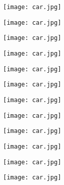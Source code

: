\begin{figure}[h!]
	\centering
	\begin{subfigure}[b]{0.225\linewidth}
		\texttt{[image: car.jpg]} %
	\end{subfigure}
	\begin{subfigure}[b]{0.225\linewidth}
		\texttt{[image: car.jpg]} %
	\end{subfigure}
	\begin{subfigure}[b]{0.225\linewidth}
		\texttt{[image: car.jpg]} %
	\end{subfigure}
	\begin{subfigure}[b]{0.225\linewidth}
		\texttt{[image: car.jpg]} %
	\end{subfigure}
	\centering
	\begin{subfigure}[b]{0.225\linewidth}
		\texttt{[image: car.jpg]} %
	\end{subfigure}
	\begin{subfigure}[b]{0.225\linewidth}
		\texttt{[image: car.jpg]} %
	\end{subfigure}
	\begin{subfigure}[b]{0.225\linewidth}
		\texttt{[image: car.jpg]} %
	\end{subfigure}
	\begin{subfigure}[b]{0.225\linewidth}
		\texttt{[image: car.jpg]} %
	\end{subfigure}
	\centering
	\begin{subfigure}[b]{0.225\linewidth}
		\texttt{[image: car.jpg]} %
	\end{subfigure}
	\begin{subfigure}[b]{0.225\linewidth}
		\texttt{[image: car.jpg]} %
	\end{subfigure}
	\begin{subfigure}[b]{0.225\linewidth}
		\texttt{[image: car.jpg]} %
	\end{subfigure}
	\begin{subfigure}[b]{0.225\linewidth}
		\texttt{[image: car.jpg]} %
	\end{subfigure}

\end{figure}

